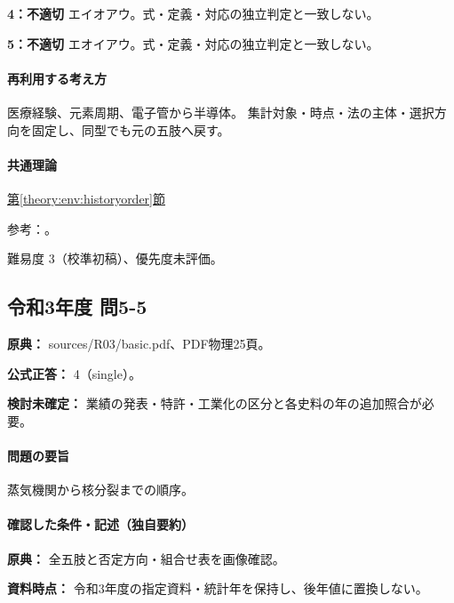 \noindent\textbf{4：不適切} エイオアウ。式・定義・対応の独立判定と一致しない。\par

\noindent\textbf{5：不適切} エオイアウ。式・定義・対応の独立判定と一致しない。\par

\paragraph{再利用する考え方} 医療経験、元素周期、電子管から半導体。 集計対象・時点・法の主体・選択方向を固定し、同型でも元の五肢へ戻す。

\paragraph{共通理論} \hyperref[theory:env:historyorder]{第\ref*{theory:env:historyorder}節}

\par 参考：\cite{env59_jenner,env58_curie}。

\par 難易度 3（校準初稿）、優先度未評価。

\subsection{令和3年度 問5-5}
\label{q:r03-reg-basic-5-5}

\noindent\textbf{原典：} sources/R03/basic.pdf、PDF物理25頁。

\textbf{公式正答：} 4（single）。

\par\textbf{検討未確定：} 業績の発表・特許・工業化の区分と各史料の年の追加照合が必要。

\paragraph{問題の要旨} 蒸気機関から核分裂までの順序。

\paragraph{確認した条件・記述（独自要約）}\mbox{}\par

\noindent\textbf{原典：} 全五肢と否定方向・組合せ表を画像確認。\par

\noindent\textbf{資料時点：} 令和3年度の指定資料・統計年を保持し、後年値に置換しない。\par

